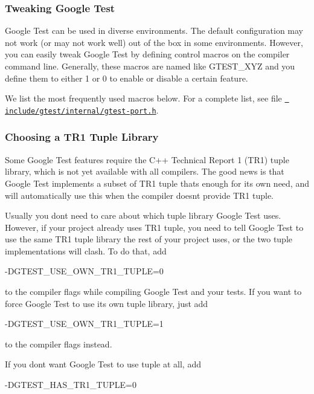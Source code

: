 \subsubsection*{Tweaking Google Test}

Google Test can be used in diverse environments. The default configuration may not work (or may not work well) out of the box in some environments. However, you can easily tweak Google Test by defining control macros on the compiler command line. Generally, these macros are named like {\ttfamily G\+T\+E\+S\+T\+\_\+\+X\+YZ} and you define them to either 1 or 0 to enable or disable a certain feature.

We list the most frequently used macros below. For a complete list, see file \href{include/gtest/internal/gtest-port.h}\texttt{ include/gtest/internal/gtest-\/port.\+h}.

\subsubsection*{Choosing a T\+R1 Tuple Library}

Some Google Test features require the C++ Technical Report 1 (T\+R1) tuple library, which is not yet available with all compilers. The good news is that Google Test implements a subset of T\+R1 tuple that\textquotesingle{}s enough for its own need, and will automatically use this when the compiler doesn\textquotesingle{}t provide T\+R1 tuple.

Usually you don\textquotesingle{}t need to care about which tuple library Google Test uses. However, if your project already uses T\+R1 tuple, you need to tell Google Test to use the same T\+R1 tuple library the rest of your project uses, or the two tuple implementations will clash. To do that, add \begin{DoxyVerb}-DGTEST_USE_OWN_TR1_TUPLE=0
\end{DoxyVerb}


to the compiler flags while compiling Google Test and your tests. If you want to force Google Test to use its own tuple library, just add \begin{DoxyVerb}-DGTEST_USE_OWN_TR1_TUPLE=1
\end{DoxyVerb}


to the compiler flags instead.

If you don\textquotesingle{}t want Google Test to use tuple at all, add \begin{DoxyVerb}-DGTEST_HAS_TR1_TUPLE=0
\end{DoxyVerb}


